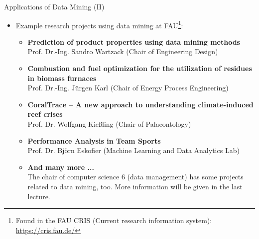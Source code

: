 \begin{frame}{Applications of Data Mining (II)}
	\begin{itemize}
		\item Example research projects using data mining at FAU\footnote{Found 
		in the FAU CRIS (Current research information system): 
		\url{https://cris.fau.de/}}:
		\begin{itemize}
			\item \textbf{Prediction of product properties using data mining 
			methods} \\
				  \small{Prof. Dr.-Ing. Sandro Wartzack (Chair of Engineering 
				  Design)}
		 	\item \textbf{Combustion and fuel optimization for the utilization 
		 	of residues in biomass furnaces} \\
		 		  \small{Prof. Dr.-Ing. Jürgen Karl (Chair of Energy Process 
		 		  Engineering)}
		 	\item \textbf{CoralTrace – A new approach to understanding 
		 	climate-induced reef crises} \\
		 	      \small{Prof. Dr. Wolfgang Kießling (Chair of Palaeontology)}
		 	\item \textbf{Performance Analysis in Team Sports} \\
		 		  \small{Prof. Dr. Björn Eskofier (Machine Learning and Data 
		 		  Analytics Lab)}
	 		\item \textbf{And many more ...} \\
	 			  \small{The chair of computer science 6 (data management) 
	 			  has some projects related to data mining, too. More 
	 			  information will be given in the last lecture.}
		\end{itemize}
	\end{itemize}
\end{frame}